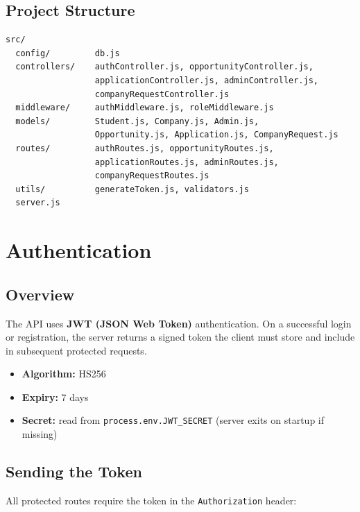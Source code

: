 \documentclass[12pt,a4paper]{article}
\begin{document}
\subsection*{Project Structure}
\begin{lstlisting}
src/
  config/         db.js
  controllers/    authController.js, opportunityController.js,
                  applicationController.js, adminController.js,
                  companyRequestController.js
  middleware/     authMiddleware.js, roleMiddleware.js
  models/         Student.js, Company.js, Admin.js,
                  Opportunity.js, Application.js, CompanyRequest.js
  routes/         authRoutes.js, opportunityRoutes.js,
                  applicationRoutes.js, adminRoutes.js,
                  companyRequestRoutes.js
  utils/          generateToken.js, validators.js
  server.js
\end{lstlisting}

\newpage

\section{Authentication}

\subsection*{Overview}

The API uses \textbf{JWT (JSON Web Token)} authentication. On a successful login or registration, the server returns a signed token the client must store and include in subsequent protected requests.

\begin{itemize}[leftmargin=1.5cm]
  \item \textbf{Algorithm:} HS256
  \item \textbf{Expiry:} 7 days
  \item \textbf{Secret:} read from \texttt{process.env.JWT\_SECRET} (server exits on startup if missing)
\end{itemize}

\subsection*{Sending the Token}

All protected routes require the token in the \texttt{Authorization} header:
\end{document}
